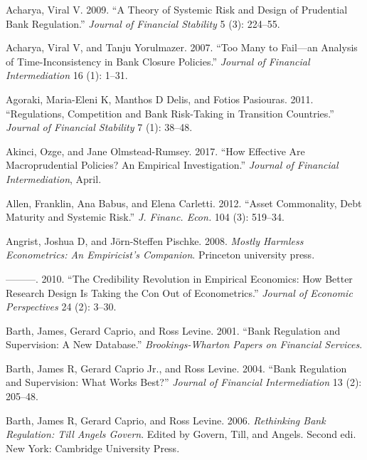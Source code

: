 \documentclass[
  10pt,
]{article}
\begin{document}
\setlength{\parindent}{-0.2in}
\setlength{\leftskip}{0.2in}
\setlength{\parskip}{8pt}
\vspace*{-0.2in}

\noindent

\hypertarget{refs}{}
\leavevmode\hypertarget{ref-Acharya2009}{}%
Acharya, Viral V. 2009. ``A Theory of Systemic Risk and Design of
Prudential Bank Regulation.'' \emph{Journal of Financial Stability} 5
(3): 224--55.

\leavevmode\hypertarget{ref-Acharya2007}{}%
Acharya, Viral V, and Tanju Yorulmazer. 2007. ``Too Many to Fail---an
Analysis of Time-Inconsistency in Bank Closure Policies.'' \emph{Journal
of Financial Intermediation} 16 (1): 1--31.

\leavevmode\hypertarget{ref-Agoraki2011}{}%
Agoraki, Maria-Eleni K, Manthos D Delis, and Fotios Pasiouras. 2011.
``Regulations, Competition and Bank Risk-Taking in Transition
Countries.'' \emph{Journal of Financial Stability} 7 (1): 38--48.

\leavevmode\hypertarget{ref-Akinci2017}{}%
Akinci, Ozge, and Jane Olmstead-Rumsey. 2017. ``How Effective Are
Macroprudential Policies? An Empirical Investigation.'' \emph{Journal of
Financial Intermediation}, April.

\leavevmode\hypertarget{ref-Allen2012}{}%
Allen, Franklin, Ana Babus, and Elena Carletti. 2012. ``Asset
Commonality, Debt Maturity and Systemic Risk.'' \emph{J. Financ. Econ.}
104 (3): 519--34.

\leavevmode\hypertarget{ref-angrist2008mostly}{}%
Angrist, Joshua D, and Jörn-Steffen Pischke. 2008. \emph{Mostly Harmless
Econometrics: An Empiricist's Companion}. Princeton university press.

\leavevmode\hypertarget{ref-angrist2010credibility}{}%
---------. 2010. ``The Credibility Revolution in Empirical Economics:
How Better Research Design Is Taking the Con Out of Econometrics.''
\emph{Journal of Economic Perspectives} 24 (2): 3--30.

\leavevmode\hypertarget{ref-Barth2001}{}%
Barth, James, Gerard Caprio, and Ross Levine. 2001. ``Bank Regulation
and Supervision: A New Database.'' \emph{Brookings-Wharton Papers on
Financial Services}.

\leavevmode\hypertarget{ref-Barth2004}{}%
Barth, James R, Gerard Caprio Jr., and Ross Levine. 2004. ``Bank
Regulation and Supervision: What Works Best?'' \emph{Journal of
Financial Intermediation} 13 (2): 205--48.

\leavevmode\hypertarget{ref-Barth2006}{}%
Barth, James R, Gerard Caprio, and Ross Levine. 2006. \emph{Rethinking
Bank Regulation: Till Angels Govern}. Edited by Govern, Till, and
Angels. Second edi. New York: Cambridge University Press.
\end{document}
